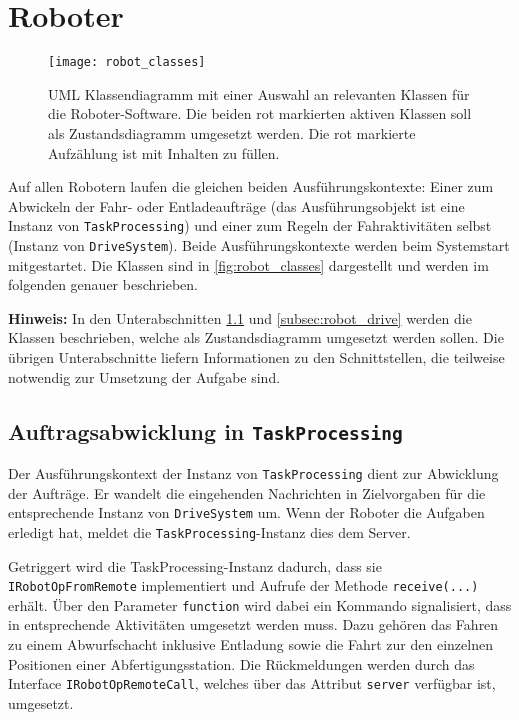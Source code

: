 
\newpage
\section{Roboter}
\label{sec:roboter}

\begin{figure}
	\centering
	\texttt{[image: robot\_classes]}
	\caption{UML Klassendiagramm mit einer Auswahl an relevanten Klassen für die Roboter-Software. Die beiden rot markierten aktiven Klassen soll als Zustandsdiagramm umgesetzt werden. Die rot markierte Aufzählung ist mit Inhalten zu füllen.}
	\label{fig:robot_classes}
\end{figure}

Auf allen Robotern laufen die gleichen beiden Ausführungskontexte: Einer zum Abwickeln der Fahr- oder Entladeaufträge (das Ausführungsobjekt ist eine Instanz von \texttt{TaskProcessing}) und einer zum Regeln der Fahraktivitäten selbst (Instanz von \texttt{DriveSystem}). Beide Ausführungskontexte werden beim Systemstart mitgestartet.
Die Klassen sind in \autoref{fig:robot_classes} dargestellt und werden im folgenden genauer beschrieben.



{\color{hpired} \textbf{Hinweis:} In den Unterabschnitten \ref{subsec:robot_task} und \ref{subsec:robot_drive} werden die Klassen beschrieben, welche als Zustandsdiagramm umgesetzt werden sollen. Die übrigen Unterabschnitte liefern Informationen zu den Schnittstellen, die teilweise notwendig zur Umsetzung der Aufgabe sind.}






\subsection{Auftragsabwicklung in \texttt{TaskProcessing}}
\label{subsec:robot_task}

Der Ausführungskontext der Instanz von \texttt{TaskProcessing} dient zur Abwicklung der Aufträge. Er wandelt die eingehenden Nachrichten in Zielvorgaben für die entsprechende Instanz von \texttt{DriveSystem} um.
Wenn der Roboter die Aufgaben erledigt hat, meldet die \texttt{TaskProcessing}-Instanz dies dem Server. 

Getriggert wird die TaskProcessing-Instanz dadurch, dass sie \texttt{IRobotOpFromRemote} implementiert und Aufrufe der Methode \texttt{receive(...)} erhält. Über den Parameter \texttt{function} wird dabei ein Kommando signalisiert, dass in entsprechende Aktivitäten umgesetzt werden muss.
Dazu gehören das Fahren zu einem Abwurfschacht inklusive Entladung sowie die Fahrt zur den einzelnen Positionen einer Abfertigungsstation. Die Rückmeldungen werden durch das Interface \texttt{IRobotOpRemoteCall}, welches über das Attribut \texttt{server} verfügbar ist, umgesetzt. 

